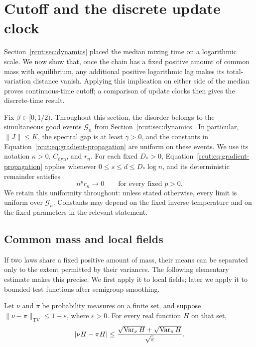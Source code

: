 \section{Cutoff and the discrete update clock}
\label{rcut:sec:cutoff}

Section~\ref{rcut:sec:dynamics} placed the median mixing time on a
logarithmic scale.  We now show that, once the chain has a fixed positive
amount of common mass with equilibrium, any additional positive
logarithmic lag makes its total-variation distance vanish.  Applying this
implication on either side of the median proves continuous-time cutoff;
a comparison of update clocks then gives the discrete-time result.

Fix $\beta\in[0,1/2)$.  Throughout this section, the disorder belongs to
the simultaneous good events $\mathcal G_n$ from
Section~\ref{rcut:sec:dynamics}.  In particular, $\|J\|\le K$, the spectral
gap is at least $\gamma>0$, and the constants in
Equation~\eqref{rcut:eq:gradient-propagation} are uniform on these events.
We use its notation $\kappa>0$, $C_{\mathrm{dyn}}$, and $r_n$.
For each fixed $D_*>0$, Equation~\eqref{rcut:eq:gradient-propagation} applies whenever
$0\le s\le d\le D_*\log n$, and its deterministic remainder satisfies
\begin{equation}
 n^p r_n\longrightarrow0\qquad\text{for every fixed }p>0.
 \label{rcut:eq:cutoff-remainder}
\end{equation}
We retain this uniformity throughout: unless stated otherwise, every
limit is uniform over $\mathcal G_n$.  Constants may depend on the fixed
inverse temperature and on the fixed parameters in the relevant
statement.

\subsection{Common mass and local fields}

If two laws share a fixed positive amount of mass, their means can
be separated only to the extent permitted by their variances.  The
following elementary estimate makes this precise.  We first apply it to
local fields; later we apply it to bounded test functions after
semigroup smoothing.

\begin{lemma}
\label{rcut:lem:common-mass}
Let $\nu$ and $\pi$ be probability measures on a finite set, and suppose
$\|\nu-\pi\|_{\mathrm{TV}}\le1-\varepsilon$, where
$\varepsilon>0$.  For every real function $H$ on that set,
\begin{equation}
 |\nu H-\pi H|
 \le \frac{\sqrt{\operatorname{Var}_\nu H}+\sqrt{\operatorname{Var}_\pi H}}
              {\sqrt{\varepsilon}}.
 \label{rcut:eq:common-mass-means}
\end{equation}
\end{lemma}

